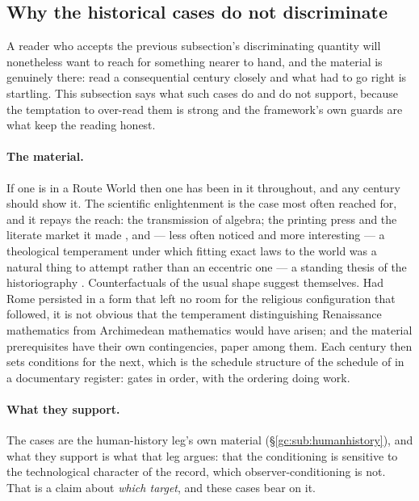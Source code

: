 \subsection{Why the historical cases do not discriminate}
\label{gc:sub:historicalcases}

A reader who accepts the previous subsection's discriminating quantity
will nonetheless want to reach for something nearer to hand, and the
material is genuinely there: read a consequential century closely and
what had to go right is startling. This subsection says what such cases
do and do not support, because the temptation to over-read them is
strong and the framework's own guards are what keep the reading honest.

\paragraph{The material.} If one is in a Route World then one has been in
it throughout, and any century should show it. The scientific
enlightenment is the case most often reached for, and it repays the
reach: the transmission of algebra; the printing press and the literate
market it made \cite{Eisenstein79}, and --- less often noticed and more interesting --- a
theological temperament under which fitting exact laws to the world was
a natural thing to attempt rather than an eccentric one --- a standing
thesis of the historiography \cite{Merton38}. Counterfactuals
of the usual shape suggest themselves. Had Rome persisted in a form that
left no room for the religious configuration that followed, it is not
obvious that the temperament distinguishing Renaissance mathematics from
Archimedean mathematics would have arisen; and the material prerequisites
have their own contingencies, paper among them. Each century then sets
conditions for the next, which is the schedule structure of
the schedule of \cite{GoldenTechnoanatomy} in a documentary register: gates in order, with
the ordering doing work.

\paragraph{What they support.} The cases are the human-history leg's own
material (\S\ref{gc:sub:humanhistory}), and what they support is what
that leg argues: that the conditioning is sensitive to the technological
character of the record, which observer-conditioning is not. That is a
claim about \emph{which target}, and these cases bear on it.

